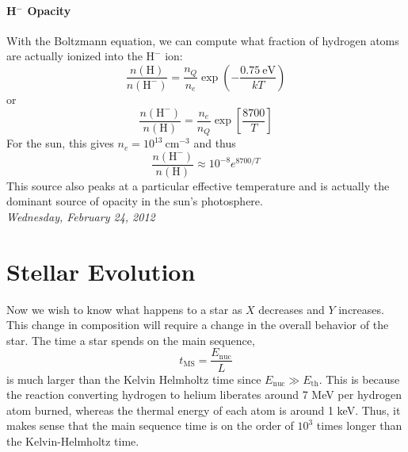 \documentclass[10pt]{article}
\numberwithin{equation}{section}
\newcommand{\n}{\noindent}
\begin{document}
    \paragraph{H${}^-$ Opacity}
    \label{par:mathrmh--opacity}
    With the Boltzmann equation, we can compute what fraction of
    hydrogen atoms are actually ionized into the $\mathrm{H}^-$ ion:
    \begin{equation}
      \label{eq:222}
      \frac{n(\mathrm{H})}{n(\mathrm{H}^-)}=\frac{n_Q}{n_e}\exp\left(-\frac
{0.75\ \mathrm{eV}}{kT}\right)
    \end{equation}
    or
    \begin{equation}
      \label{eq:223}
      \frac{n(\mathrm{H^-})}{n(\mathrm{H})}=\frac{n_e}{n_Q}\exp\left[\frac
{8700}{T}\right]
    \end{equation}
    For the sun, this gives $n_e=10^{13}\ \mathrm{cm^{-3}}$ and thus
    \begin{equation}
      \label{eq:224}
      \frac{n(\mathrm{H}^-)}{n(\mathrm{H})}\approx 10^{-8}e^{8700/T}
    \end{equation}
    This source also peaks at a particular effective temperature and
    is actually the dominant source of opacity in the sun's
    photosphere.\\

    \n \textit{Wednesday, February 24, 2012}

    \section{Stellar Evolution}
    
    Now we wish to know what happens to a star as $X$ decreases and
    $Y$ increases.  This change in composition will require a change
    in the overall behavior of the star. The time a star spends on the
    main sequence,
    \begin{equation}
      \label{eq:226}
      t_{\mathrm{MS}}=\frac{E_{\mathrm{nuc}}}{L}
    \end{equation}
    is much larger than the Kelvin Helmholtz time since
    $E_{\mathrm{nuc}}\gg E_{\mathrm{th}}$. This is because the
    reaction converting hydrogen to helium liberates around 7 MeV per
    hydrogen atom burned, whereas the thermal energy of each atom is
    around 1 keV. Thus, it makes sense that the main sequence time is
    on the order of $10^3$ times longer than the Kelvin-Helmholtz
    time.\\
\end{document}
